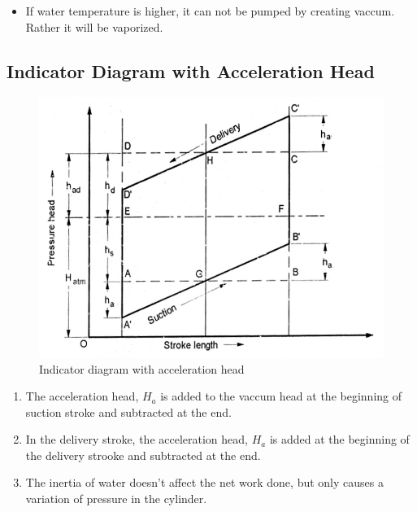 \documentclass{article}
\begin{document}
\begin{itemize}
  \item If water temperature is higher, it can not be pumped by creating vaccum. Rather it will be vaporized. 
\end{itemize}


\subsection*{Indicator Diagram with Acceleration Head}
\begin{figure}[h]
  \begin{center}
    \includegraphics*[width=0.7\linewidth]{img/indicator_dia.jpeg}
    \caption*{Indicator diagram with acceleration head}
  \end{center}
  \end{figure}

\begin{enumerate}
  \item The acceleration head, $H_a$ is added to the vaccum head at the beginning of suction stroke and subtracted at the end.
  \item In the delivery stroke, the acceleration head, $H_a$ is added at the beginning of the delivery strooke and subtracted at the end. 
  \item The inertia of water doesn't affect the net work done, but only causes a variation of pressure in the cylinder.  
\end{enumerate}
\end{document}
